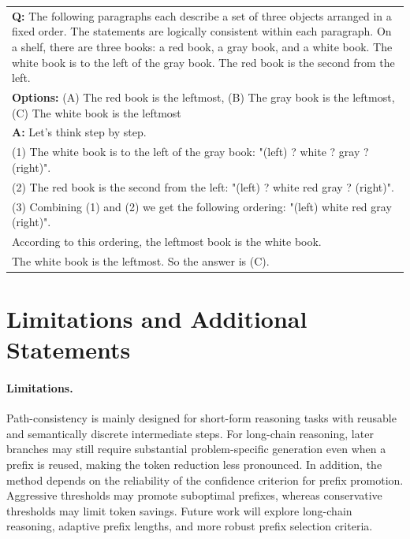 \begin{table}[H]
\begin{tabularx}{\columnwidth}{@{}X@{}}
        \textbf{Q:} The following paragraphs each describe a set of three objects arranged in a fixed order. The statements are logically consistent within each paragraph. On a shelf, there are three books: a red book, a gray book, and a white book. The white book is to the left of the gray book. The red book is the second from the left. \\
        \textbf{Options:} (A) The red book is the leftmost, (B) The gray book is the leftmost, (C) The white book is the leftmost \\
        \textbf{A:} Let's think step by step. \\
        (1) The white book is to the left of the gray book: "(left) ? white ? gray ? (right)". \\
        (2) The red book is the second from the left: "(left) ? white red gray ? (right)". \\
        (3) Combining (1) and (2) we get the following ordering: "(left) white red gray (right)". \\
        According to this ordering, the leftmost book is the white book. \\
        The white book is the leftmost. So the answer is (C). \\
        \bottomrule
    \end{tabularx}
\end{table}

\section{Limitations and Additional Statements}
\label{app:limitations-statements}

\paragraph{Limitations.}
Path-consistency is mainly designed for short-form reasoning tasks with reusable and semantically discrete intermediate steps. For long-chain reasoning, later branches may still require substantial problem-specific generation even when a prefix is reused, making the token reduction less pronounced. In addition, the method depends on the reliability of the confidence criterion for prefix promotion. Aggressive thresholds may promote suboptimal prefixes, whereas conservative thresholds may limit token savings. Future work will explore long-chain reasoning, adaptive prefix lengths, and more robust prefix selection criteria.

